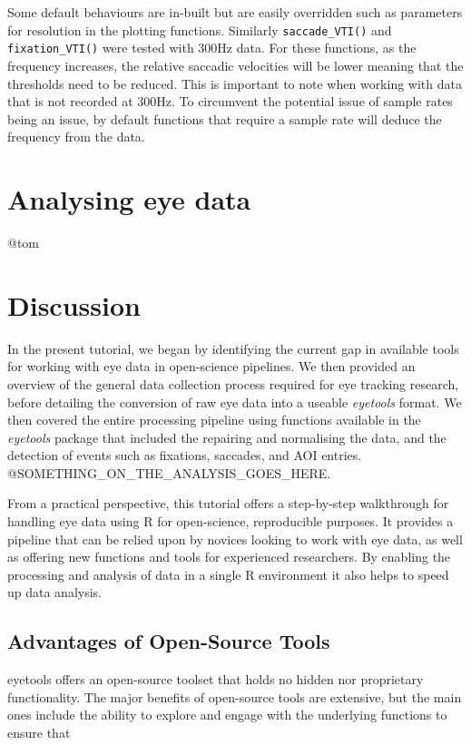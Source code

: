\documentclass[
  man,
  floatsintext,
  longtable,
  nolmodern,
  notxfonts,
  notimes,
  colorlinks=true,linkcolor=blue,citecolor=blue,urlcolor=blue]{apa7}
\begin{document}
Some default behaviours are in-built but are easily overridden such as
parameters for resolution in the plotting functions. Similarly
\texttt{saccade\_VTI()} and \texttt{fixation\_VTI()} were tested with
300Hz data. For these functions, as the frequency increases, the
relative saccadic velocities will be lower meaning that the thresholds
need to be reduced. This is important to note when working with data
that is not recorded at 300Hz. To circumvent the potential issue of
sample rates being an issue, by default functions that require a sample
rate will deduce the frequency from the data.

\section{Analysing eye data}\label{analysing-eye-data}

@tom

\section{Discussion}\label{discussion}

In the present tutorial, we began by identifying the current gap in
available tools for working with eye data in open-science pipelines. We
then provided an overview of the general data collection process
required for eye tracking research, before detailing the conversion of
raw eye data into a useable \emph{eyetools} format. We then covered the
entire processing pipeline using functions available in the
\emph{eyetools} package that included the repairing and normalising the
data, and the detection of events such as fixations, saccades, and AOI
entries. @SOMETHING\_ON\_THE\_ANALYSIS\_GOES\_HERE.

From a practical perspective, this tutorial offers a step-by-step
walkthrough for handling eye data using R for open-science, reproducible
purposes. It provides a pipeline that can be relied upon by novices
looking to work with eye data, as well as offering new functions and
tools for experienced researchers. By enabling the processing and
analysis of data in a single R environment it also helps to speed up
data analysis.

\subsection{Advantages of Open-Source
Tools}\label{advantages-of-open-source-tools}

eyetools offers an open-source toolset that holds no hidden nor
proprietary functionality. The major benefits of open-source tools are
extensive, but the main ones include the ability to explore and engage
with the underlying functions to ensure that
\end{document}
